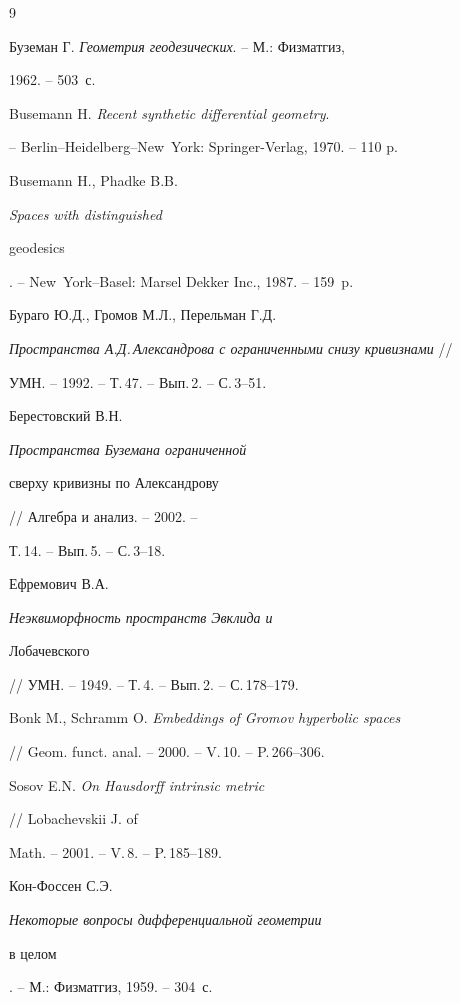 \begin{thebibliography}{9}





 Буземан Г. {\em Геометрия геодезических}. -- М.: Физматгиз,


1962. -- 503~с.





 Busemann H. {\em Recent synthetic differential geometry}.


-- Berlin--Heidelberg--New~York: Springer-Verlag, 1970. -- 110 p.





 Busemann H., Phadke B.B. {\em Spaces with distinguished


geodesics}. -- New~York--Basel: Marsel Dekker Inc., 1987. -- 159~p.





 Бураго Ю.Д., Громов М.Л., Перельман Г.Д.


{\em Пространства А.Д.\,Александрова с ограниченными снизу кривизнами} //


УМН. -- 1992. -- Т.\,47. -- Вып.\,2. -- С.\,3--51.





 Берестовский В.Н. {\em Пространства Буземана ограниченной


сверху кривизны по Александрову} // Алгебра и анализ. -- 2002. --


Т.\,14. -- Вып.\,5. -- С.\,3--18.





 Ефремович В.А. {\em Неэквиморфность пространств Эвклида и 


Лобачевского} // УМН. -- 1949. -- Т.\,4. -- Вып.\,2. -- С.\,178--179.





 Bonk M., Schramm O. {\em Embeddings of Gromov hyperbolic spaces}


// Geom. funct. anal. -- 2000. -- V.\,10. -- P.\,266--306.





 Sosov E.N. {\em On Hausdorff intrinsic metric}


// Lobachevskii J. of


Math. -- 2001. -- V.\,8. -- P.\,185--189.





 Кон-Фоссен С.Э. {\em Некоторые вопросы дифференциальной геометрии


в целом}. -- М.: Физматгиз, 1959. -- 304~с.





\end{thebibliography}





